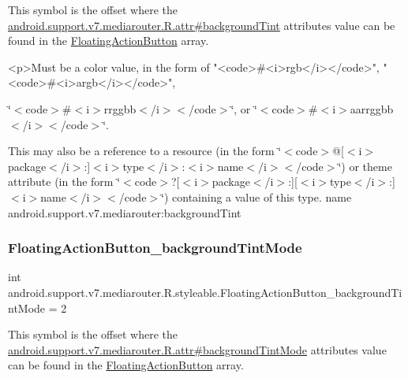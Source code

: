 This symbol is the offset where the \hyperlink{classandroid_1_1support_1_1v7_1_1mediarouter_1_1R_1_1attr_a3462fb05b26ddf9e114524febcf9fd1c}{android.\+support.\+v7.\+mediarouter.\+R.\+attr\#background\+Tint} attribute\textquotesingle{}s value can be found in the \hyperlink{classandroid_1_1support_1_1v7_1_1mediarouter_1_1R_1_1styleable_ae665bad1758a0b708ec034929b76af91}{Floating\+Action\+Button} array.

\begin{DoxyVerb}      <p>Must be a color value, in the form of "<code>#<i>rgb</i></code>", "<code>#<i>argb</i></code>",
\end{DoxyVerb}
 \char`\"{}$<$code$>$\#$<$i$>$rrggbb$<$/i$>$$<$/code$>$\char`\"{}, or \char`\"{}$<$code$>$\#$<$i$>$aarrggbb$<$/i$>$$<$/code$>$\char`\"{}. 

This may also be a reference to a resource (in the form \char`\"{}$<$code$>$@\mbox{[}$<$i$>$package$<$/i$>$\+:\mbox{]}$<$i$>$type$<$/i$>$\+:$<$i$>$name$<$/i$>$$<$/code$>$\char`\"{}) or theme attribute (in the form \char`\"{}$<$code$>$?\mbox{[}$<$i$>$package$<$/i$>$\+:\mbox{]}\mbox{[}$<$i$>$type$<$/i$>$\+:\mbox{]}$<$i$>$name$<$/i$>$$<$/code$>$\char`\"{}) containing a value of this type.  name android.\+support.\+v7.\+mediarouter\+:background\+Tint \mbox{\label{classandroid_1_1support_1_1v7_1_1mediarouter_1_1R_1_1styleable_a6dab3663758d5db831d0a3c6d4c3cfd0}} 
\subsubsection{\texorpdfstring{Floating\+Action\+Button\+\_\+background\+Tint\+Mode}{FloatingActionButton\_backgroundTintMode}}
{\footnotesize\ttfamily int android.\+support.\+v7.\+mediarouter.\+R.\+styleable.\+Floating\+Action\+Button\+\_\+background\+Tint\+Mode = 2\hspace{0.3cm}{\ttfamily [static]}}

This symbol is the offset where the \hyperlink{classandroid_1_1support_1_1v7_1_1mediarouter_1_1R_1_1attr_aefc80f6abace3364d34c2ae3f36b7b66}{android.\+support.\+v7.\+mediarouter.\+R.\+attr\#background\+Tint\+Mode} attribute\textquotesingle{}s value can be found in the \hyperlink{classandroid_1_1support_1_1v7_1_1mediarouter_1_1R_1_1styleable_ae665bad1758a0b708ec034929b76af91}{Floating\+Action\+Button} array.

